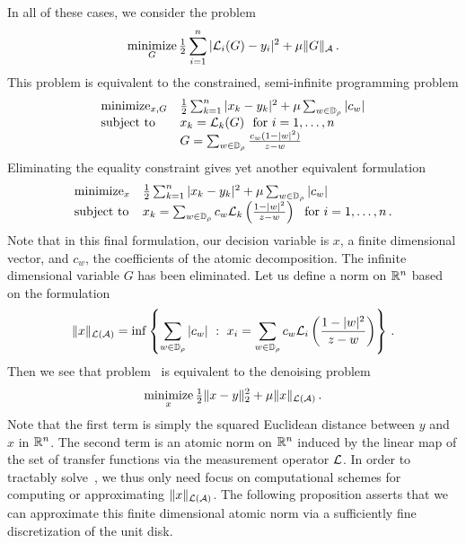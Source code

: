 In all of these cases, we consider the problem
\begin{equation}\label{eq:atomic-norm-lin-inverse}
	\mathop{\operatorname{minimize}}_{G} \tfrac{1}{2} \sum_{i=1}^n |\mathcal{L}_i(G) - y_i |^2 + \mu \|G\|_{\mathcal{A}}\,.
\end{equation}
This problem is equivalent to the constrained, semi-infinite programming problem
\[
	\begin{array}{ll}
	\mathop{\operatorname{minimize}}_{x,G} & \tfrac{1}{2}\sum_{k=1}^n |x_k - y_k |^2 + \mu \sum_{w\in \mathbb{D}_\rho} |c_w|\\
	\mbox{subject to} & x_k = \mathcal{L}_k(G)~~\mbox{for}~i=1,\ldots, n\\
	& G = \sum_{w\in \mathbb{D}_\rho} \frac{c_w(1-|w|^2)}{z-w}
	\end{array}
\]
Eliminating the equality constraint gives yet another equivalent formulation
\begin{equation}\label{eq:atomic-norm-lin-inverse-finite-dim}
	\begin{array}{ll}
	\mathop{\operatorname{minimize}}_{x} & \tfrac{1}{2}\sum_{k=1}^n |x_k - y_k |^2 + \mu \sum_{w\in \mathbb{D}_\rho} |c_w|\\
	\mbox{subject to} & x_k = \sum_{w\in \mathbb{D}_\rho} c_w \mathcal{L}_k\left(\frac{1-|w|^2}{z-w}\right)~~\mbox{for}~i=1,\ldots, n\,.
	\end{array}
\end{equation}
Note that in this final formulation, our decision variable is $x$, a finite dimensional vector, and $c_w$, the coefficients of the atomic decomposition.  The infinite dimensional variable $G$ has been eliminated.  Let us define a norm on $\mathbb{R}^n$ based on the formulation~
\[
	\|x\|_{\mathcal{L}(\mathcal{A})} = \inf \left\{ \sum_{w\in \mathbb{D}_\rho} |c_w| ~:~ x_i = \sum_{w\in\mathbb{D}_\rho} c_w\mathcal{L}_i\left(\frac{1-|w|^2}{z-w} \right)\right\}\,.
\]
Then we see that problem~ is equivalent to the denoising problem
\begin{equation}\label{eq:finite-dim-ast}
	\mathop{\operatorname{minimize}}_{x} \tfrac{1}{2}\|x-y\|_2^2 + \mu \|x\|_{\mathcal{L}(\mathcal{A})}\,.
\end{equation}
Note that the first term is simply the squared Euclidean distance between $y$ and $x$ in $\mathbb{R}^n$.  The second term is an atomic norm on $\mathbb{R}^n$ induced by the linear map of the set of transfer functions via the measurement operator $\mathcal{L}$.  In order to tractably solve~, we thus only need focus on computational schemes for computing or approximating $\|x\|_{\mathcal{L}(\mathcal{A})}$.  The following proposition asserts that we can approximate this finite dimensional atomic norm via a sufficiently fine discretization of the unit disk.



